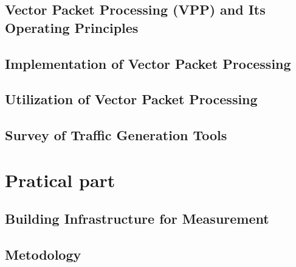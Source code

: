 \section{Vector Packet Processing (VPP) and Its Operating Principles}


\section{Implementation of Vector Packet Processing}


\section{Utilization of Vector Packet Processing}


\section{Survey of Traffic Generation Tools}


\chapter{Pratical part}

\section{Building Infrastructure for Measurement}


\section{Metodology}


